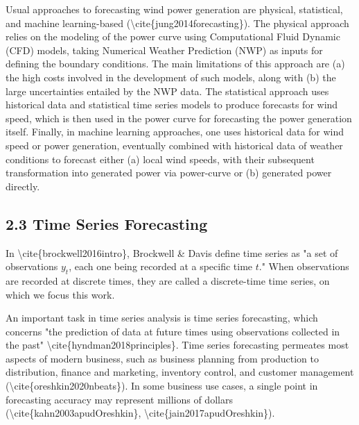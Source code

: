 \documentclass[
]{article}
\begin{document}
Usual approaches to forecasting wind power generation are physical,
statistical, and machine learning-based
(\textbackslash cite\{jung2014forecasting\}). The physical approach
relies on the modeling of the power curve using Computational Fluid
Dynamic (CFD) models, taking Numerical Weather Prediction (NWP) as
inputs for defining the boundary conditions. The main limitations of
this approach are (a) the high costs involved in the development of such
models, along with (b) the large uncertainties entailed by the NWP data.
The statistical approach uses historical data and statistical time
series models to produce forecasts for wind speed, which is then used in
the power curve for forecasting the power generation itself. Finally, in
machine learning approaches, one uses historical data for wind speed or
power generation, eventually combined with historical data of weather
conditions to forecast either (a) local wind speeds, with their
subsequent transformation into generated power via power-curve or (b)
generated power directly.

\hypertarget{header-n33}{%
\subsection{2.3 Time Series Forecasting}\label{header-n33}}

In \textbackslash cite\{brockwell2016intro\}, Brockwell \& Davis define
time series as "a set of observations \(y_t\), each one being recorded
at a specific time \(t\)." When observations are recorded at discrete
times, they are called a discrete-time time series, on which we focus
this work.

An important task in time series analysis is time series forecasting,
which concerns "the prediction of data at future times using
observations collected in the past"
\textbackslash cite\{hyndman2018principles\}. Time series forecasting
permeates most aspects of modern business, such as business planning
from production to distribution, finance and marketing, inventory
control, and customer management
(\textbackslash cite\{oreshkin2020nbeats\}). In some business use cases,
a single point in forecasting accuracy may represent millions of dollars
(\textbackslash cite\{kahn2003apudOreshkin\},
\textbackslash cite\{jain2017apudOreshkin\}).
\end{document}
